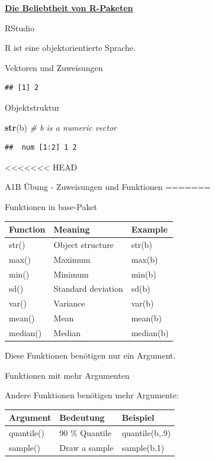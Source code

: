 \documentclass[ignorenonframetext,]{beamer}
\newenvironment{Shaded}{\begin{snugshade}}{\end{snugshade}}
\newcommand{\KeywordTok}[1]{\textcolor[rgb]{0.13,0.29,0.53}{\textbf{#1}}}
\newcommand{\CommentTok}[1]{\textcolor[rgb]{0.56,0.35,0.01}{\textit{#1}}}
\newcommand{\NormalTok}[1]{#1}
\newcommand{\CommentTok}[1]{\textcolor[rgb]{0.56,0.35,0.01}{\textit{#1}}}
\newcommand{\KeywordTok}[1]{\textcolor[rgb]{0.13,0.29,0.53}{\textbf{#1}}}
\newcommand{\NormalTok}[1]{#1}
\begin{document}
\begin{frame}{\href{https://gallery.shinyapps.io/cran-gauge/}{\textbf{Die
Beliebtheit von R-Paketen}}}
\begin{frame}{RStudio}
\begin{frame}[fragile]{R ist eine objektorientierte Sprache.}
\begin{block}{Vektoren und Zuweisungen}
\begin{verbatim}
## [1] 2
\end{verbatim}

\end{block}

\begin{block}{Objektstruktur}

\begin{Shaded}
\begin{Highlighting}[]
\KeywordTok{str}\NormalTok{(b) }\CommentTok{# b is a numeric vector}
\end{Highlighting}
\end{Shaded}

\begin{verbatim}
##  num [1:2] 1 2
\end{verbatim}

\end{block}

\end{frame}

<<<<<<< HEAD
\begin{frame}[fragile]{A1B Übung - Zuweisungen und Funktionen}
=======
\begin{frame}{Funktionen in base-Paket}
\protect\hypertarget{funktionen-in-base-paket}{}

\begin{longtable}[]{@{}lll@{}}
\toprule
Function & Meaning & Example\tabularnewline
\midrule
\endhead
str() & Object structure & str(b)\tabularnewline
max() & Maximum & max(b)\tabularnewline
min() & Minimum & min(b)\tabularnewline
sd() & Standard deviation & sd(b)\tabularnewline
var() & Variance & var(b)\tabularnewline
mean() & Mean & mean(b)\tabularnewline
median() & Median & median(b)\tabularnewline
\bottomrule
\end{longtable}

Diese Funktionen benötigen nur ein Argument.

\end{frame}

\begin{frame}[fragile]{Funktionen mit mehr Argumenten}
\protect\hypertarget{funktionen-mit-mehr-argumenten}{}

\begin{block}{Andere Funktionen benötigen mehr Argumente:}

\begin{longtable}[]{@{}lll@{}}
\toprule
Argument & Bedeutung & Beispiel\tabularnewline
\midrule
\endhead
quantile() & 90 \% Quantile & quantile(b,.9)\tabularnewline
sample() & Draw a sample & sample(b,1)\tabularnewline
\bottomrule
\end{longtable}


\end{block}
\end{frame}
\end{frame}
\end{frame}
\end{frame}
\end{document}
